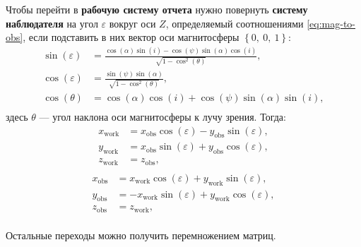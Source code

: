 \documentclass[12pt]{article}
\begin{document}
\begin{itemize}
Чтобы перейти в \textbf{рабочую систему отчета} нужно повернуть \textbf{систему наблюдателя} на угол $\varepsilon$ вокруг оси $Z$, определяемый соотношениями \eqref{eq:mag-to-obs}, если подставить в них вектор оси магнитосферы $\left\lbrace 0,\ 0,\ 1 \right\rbrace$:
%
\begin{equation}\label{eq:work-orientation}
\begin{aligned}
\sin(\varepsilon) &= \frac{\cos(\alpha)\sin(i) - \cos(\psi)\sin(\alpha)\cos(i)}{\sqrt{1-\cos^2(\theta)}}, \\
\cos(\varepsilon) &= \frac{\sin(\psi)\sin(\alpha)}{\sqrt{1-\cos^2(\theta)}}, \\
\cos(\theta) &= \cos(\alpha)\cos(i) + \cos(\psi)\sin(\alpha)\sin(i), \\
\end{aligned}
\end{equation}
%
здесь $\theta$ --- угол наклона оси магнитосферы к лучу зрения. Тогда:
%
\begin{equation}\label{eq:obs-to-work}
\begin{aligned}
x_\text{work} &= x_\text{obs}\cos(\varepsilon) - y_\text{obs}\sin(\varepsilon), \\
y_\text{work} &= x_\text{obs}\sin(\varepsilon) + y_\text{obs}\cos(\varepsilon) , \\
z_\text{work} &= z_\text{obs}, \\
\end{aligned}
\end{equation}
%
\begin{equation}\label{eq:work-to-obs}
\begin{aligned}
x_\text{obs} &= x_\text{work}\cos(\varepsilon) + y_\text{work}\sin(\varepsilon), \\
y_\text{obs} &= - x_\text{work}\sin(\varepsilon) + y_\text{work}\cos(\varepsilon) , \\
z_\text{obs} &= z_\text{work}, \\
\end{aligned}
\end{equation}

Остальные переходы можно получить перемножением матриц.
\end{itemize}
\end{document}
